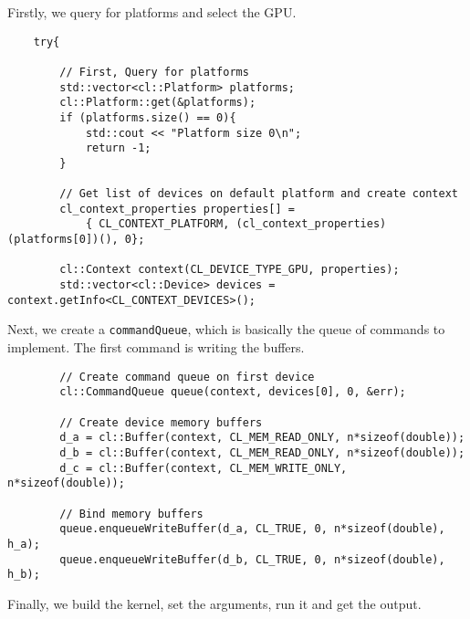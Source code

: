 \documentclass[11pt]{article}
\begin{document}
Firstly, we query for platforms and select the GPU.

\begin{lstlisting}
    try{

        // First, Query for platforms
        std::vector<cl::Platform> platforms;
        cl::Platform::get(&platforms);
        if (platforms.size() == 0){
            std::cout << "Platform size 0\n";
            return -1;
        }

        // Get list of devices on default platform and create context
        cl_context_properties properties[] =
            { CL_CONTEXT_PLATFORM, (cl_context_properties)(platforms[0])(), 0};

        cl::Context context(CL_DEVICE_TYPE_GPU, properties);
        std::vector<cl::Device> devices = context.getInfo<CL_CONTEXT_DEVICES>();

\end{lstlisting}

Next, we create a \lstinline{commandQueue}, which is basically the queue of commands to implement. The first command is writing the buffers.

\begin{lstlisting}
        // Create command queue on first device
        cl::CommandQueue queue(context, devices[0], 0, &err);

        // Create device memory buffers
        d_a = cl::Buffer(context, CL_MEM_READ_ONLY, n*sizeof(double));
        d_b = cl::Buffer(context, CL_MEM_READ_ONLY, n*sizeof(double));
        d_c = cl::Buffer(context, CL_MEM_WRITE_ONLY, n*sizeof(double));

        // Bind memory buffers
        queue.enqueueWriteBuffer(d_a, CL_TRUE, 0, n*sizeof(double), h_a);
        queue.enqueueWriteBuffer(d_b, CL_TRUE, 0, n*sizeof(double), h_b);

\end{lstlisting}

Finally, we build the kernel, set the arguments, run it and get the output.
\end{document}
